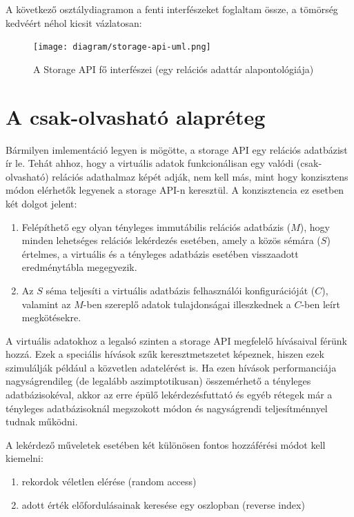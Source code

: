 \documentclass[
    parspace,
    noindent,
    nohyp,
]{elteiktdk}[2023/04/10]
\begin{document}
A következő osztálydiagramon a fenti interfészeket foglaltam össze,
a tömörség kedvéért néhol kicsit vázlatosan:

\begin{figure}[H]
\centering
\texttt{[image: diagram/storage-api-uml.png]}
\caption{A Storage API fő interfészei (egy relációs adattár alapontológiája)}
\end{figure}

\section{A csak-olvasható alapréteg}

Bármilyen imlementáció legyen is mögötte, a storage API egy relációs adatbázist ír le.
Tehát ahhoz, hogy a virtuális adatok funkcionálisan egy valódi (csak-olvasható) relációs adathalmaz képét adják,
nem kell más, mint hogy konzisztens módon elérhetők legyenek a storage API-n keresztül.
A konzisztencia ez esetben két dolgot jelent:

\begin{enumerate}
  \item Felépíthető egy olyan tényleges immutábilis relációs adatbázis ($M$),
        hogy minden lehetséges relációs lekérdezés esetében, amely a közös sémára ($S$) értelmes,
        a virtuális és a tényleges adatbázis esetében visszaadott eredménytábla megegyezik.
  \item Az $S$ séma teljesíti a virtuális adatbázis felhasználói konfigurációját ($C$),
        valamint az $M$-ben szereplő adatok tulajdonságai illeszkednek a $C$-ben leírt megkötésekre.
\end{enumerate}

A virtuális adatokhoz a legalsó szinten a storage API megfelelő hívásaival férünk hozzá.
Ezek a speciális hívások szűk keresztmetszetet képeznek,
hiszen ezek szimulálják például a közvetlen adatelérést is.
Ha ezen hívások performanciája nagyságrendileg (de legalább aszimptotikusan) összemérhető a tényleges adatbázisokéval,
akkor az erre épülő lekérdezésfuttató és egyéb rétegek már
a tényleges adatbázisoknál megszokott módon és nagyságrendi teljesítménnyel tudnak működni.

A lekérdező műveletek esetében két különösen fontos hozzáférési módot kell kiemelni:

\begin{enumerate}
  \item rekordok véletlen elérése (random access)
  \item adott érték előfordulásainak keresése egy oszlopban (reverse index)
\end{enumerate}
\end{document}
